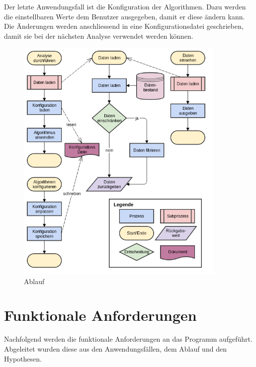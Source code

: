 Der letzte Anwendungsfall ist die Konfiguration der Algorithmen. Dazu werden die einstellbaren Werte dem Benutzer ausgegeben, damit er diese ändern kann. Die Änderungen werden anschliessend in eine Konfigurationsdatei geschrieben, damit sie bei der nächsten Analyse verwendet werden können.

\begin{figure}[H]
	\RawFloats
	\centering
	\includegraphics[width=0.9\textwidth]{images/flowchart}
	\caption{Ablauf}
	\label{fig:anfoderungsanalyse:ablauf:1}
\end{figure}

\section{Funktionale Anforderungen}
\label{sec:anforderungsanalyse:funktionaleanforderung}
Nachfolgend werden die funktionale Anforderungen an das Programm aufgeführt. Abgeleitet wurden diese aus den Anwendungsfällen, dem Ablauf und den Hypothesen.

